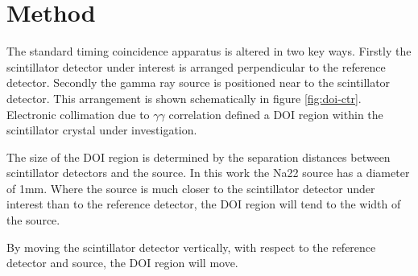 \section{Method}
The standard timing coincidence apparatus is altered in two key ways. Firstly the scintillator detector under interest is arranged perpendicular to the reference detector. Secondly the gamma ray source is positioned near to the scintillator detector. This arrangement is shown schematically in figure \ref{fig:doi-ctr}. Electronic collimation due to $\gamma\gamma$ correlation defined a DOI region within the scintillator crystal under investigation. 

The size of the DOI region is determined by the separation distances between scintillator detectors and the source. In this work the Na22 source has a diameter of 1mm. Where the source is much closer to the scintillator detector under interest than to the reference detector, the DOI region will tend to the width of the source.

By moving the scintillator detector vertically, with respect to the reference detector and source, the DOI region will move.


\cite{arron_Meyer_Pauwels_Lecoq_2012}